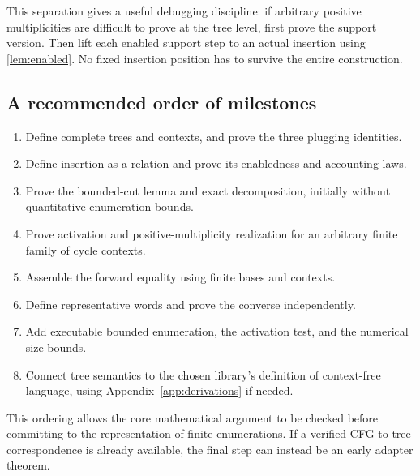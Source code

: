 \documentclass[11pt,a4paper]{article}
\numberwithin{equation}{section}
\theoremstyle{plain}
\theoremstyle{definition}
\theoremstyle{remark}
\begin{document}
This separation gives a useful debugging discipline: if arbitrary positive multiplicities are difficult to prove at the tree level, first prove the support version. Then lift each enabled support step to an actual insertion using \cref{lem:enabled}. No fixed insertion position has to survive the entire construction.

\subsection{A recommended order of milestones}
\begin{enumerate}
\item Define complete trees and contexts, and prove the three plugging identities.
\item Define insertion as a relation and prove its enabledness and accounting laws.
\item Prove the bounded-cut lemma and exact decomposition, initially without quantitative enumeration bounds.
\item Prove activation and positive-multiplicity realization for an arbitrary finite family of cycle contexts.
\item Assemble the forward equality using finite bases and contexts.
\item Define representative words and prove the converse independently.
\item Add executable bounded enumeration, the activation test, and the numerical size bounds.
\item Connect tree semantics to the chosen library's definition of context-free language, using Appendix~\ref{app:derivations} if needed.
\end{enumerate}

This ordering allows the core mathematical argument to be checked before committing to the representation of finite enumerations. If a verified CFG-to-tree correspondence is already available, the final step can instead be an early adapter theorem.
\end{document}
